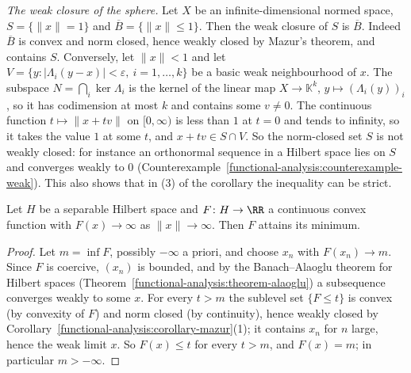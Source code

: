 \begin{example}\label{functional-analysis:example-weak-closure-sphere}
\emph{The weak closure of the sphere.} Let $X$ be an infinite-dimensional normed space, $S = \{\|x\| = 1\}$ and $\overline{B} = \{\|x\| \leq 1\}$. Then the weak closure of $S$ is $\overline{B}$. Indeed $\overline{B}$ is convex
and norm closed, hence weakly closed by Mazur's theorem, and contains $S$. Conversely, let $\|x\| < 1$ and let $V = \{y : |\Lambda_i(y - x)| < \varepsilon, \ i = 1, \ldots, k\}$ be a basic weak neighbourhood of $x$.
The subspace $N = \bigcap_i\ker\Lambda_i$ is the kernel of the linear map $X \to \mathbb{K}^k$, $y \mapsto (\Lambda_i(y))_i$, so it has codimension at most $k$ and contains some $v \neq 0$. The continuous function
$t \mapsto \|x + tv\|$ on $[0, \infty)$ is less than $1$ at $t = 0$ and tends to infinity, so it takes the value $1$ at some $t$, and $x + tv \in S \cap V$. So the norm-closed set $S$ is not weakly closed: for
instance an orthonormal sequence in a Hilbert space lies on $S$ and converges weakly to $0$ (Counterexample~\ref{functional-analysis:counterexample-weak}). This also shows that in (3) of the corollary the
inequality can be strict.
\end{example}

\begin{proposition}\label{functional-analysis:proposition-direct-method}
Let $H$ be a separable Hilbert space and $F \colon H \to \RR$ a continuous convex function with $F(x) \to \infty$ as $\|x\| \to \infty$. Then $F$ attains its minimum.
\end{proposition}

\begin{proof}
Let $m = \inf F$, possibly $-\infty$ a priori, and choose $x_n$ with $F(x_n) \to m$. Since $F$ is coercive, $(x_n)$ is bounded, and by the Banach--Alaoglu theorem for Hilbert spaces
(Theorem~\ref{functional-analysis:theorem-alaoglu}) a subsequence converges weakly to some $x$. For every $t > m$ the sublevel set $\{F \leq t\}$ is convex (by convexity of $F$) and norm closed (by
continuity), hence weakly closed by Corollary~\ref{functional-analysis:corollary-mazur}(1); it contains $x_n$ for $n$ large, hence the weak limit $x$. So $F(x) \leq t$ for every $t > m$, and $F(x) = m$; in particular
$m > -\infty$.
\end{proof}

